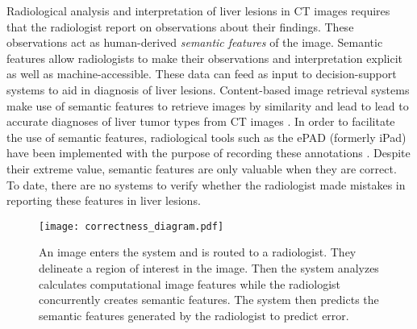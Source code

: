 Radiological analysis and interpretation of liver lesions in CT images requires that the radiologist report on observations about their findings. These observations act as human-derived \emph{semantic features} of the image. Semantic features allow radiologists to make their observations and interpretation explicit as well as machine-accessible. These data can feed as input to decision-support systems to aid in diagnosis of liver lesions. Content-based image retrieval systems make use of semantic features to retrieve images by similarity \cite{Napel:2010vb} and lead to lead to accurate diagnoses of liver tumor types from CT images \cite{Korenblum:2011gx}. In order to facilitate the use of semantic features, radiological tools such as the ePAD (formerly iPad) have been implemented with the purpose of recording these annotations \cite{Rubin:2008uz}. Despite their extreme value, semantic features are only valuable when they are correct. To date, there are no systems to verify whether the radiologist made mistakes in reporting these features in liver lesions.


\begin{figure}[h]
	\centering
	\texttt{[image: correctness\_diagram.pdf]}
	\caption[Overview of the the annotation verification system]{An image enters the system and is routed to a radiologist. They delineate a region of interest in the image. Then the system analyzes calculates computational image features while the radiologist concurrently creates semantic features. The system then predicts the semantic features generated by the radiologist to predict error.}
	\label{fig:correctness_diagram}
\end{figure}

